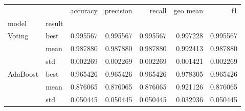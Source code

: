 \begin{tabular}{llrrrrr}
\toprule
         &     &  accuracy &  precision &    recall &  geo mean &        f1 \\
model & result &           &            &           &           &           \\
\midrule
Voting & best &  0.995567 &   0.995567 &  0.995567 &  0.997228 &  0.995567 \\
         & mean &  0.987880 &   0.987880 &  0.987880 &  0.992413 &  0.987880 \\
         & std &  0.002269 &   0.002269 &  0.002269 &  0.001421 &  0.002269 \\
AdaBoost & best &  0.965426 &   0.965426 &  0.965426 &  0.978305 &  0.965426 \\
         & mean &  0.876065 &   0.876065 &  0.876065 &  0.921126 &  0.876065 \\
         & std &  0.050445 &   0.050445 &  0.050445 &  0.032936 &  0.050445 \\
\bottomrule
\end{tabular}
